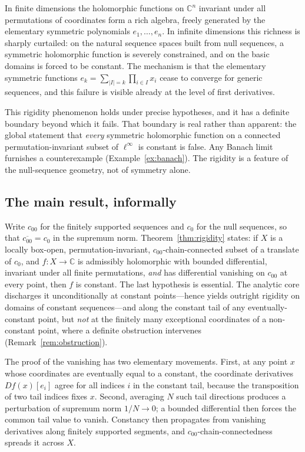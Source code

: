 \documentclass[11pt]{amsart}
\newcommand{\CC}{\mathbb{C}}
\newcommand{\cc}{c_{00}}
\newcommand{\czero}{c_{0}}
\theoremstyle{plain}
\theoremstyle{definition}
\theoremstyle{remark}
\begin{document}
In finite dimensions the holomorphic functions on $\CC^n$ invariant under
all permutations of coordinates form a rich algebra, freely generated by
the elementary symmetric polynomials $e_1,\ldots,e_n$. In infinite
dimensions this richness is sharply curtailed: on the natural sequence
spaces built from null sequences, a symmetric holomorphic function is
severely constrained, and on the basic domains is forced to be constant.
The mechanism is that the elementary symmetric functions
$e_k=\sum_{|I|=k}\prod_{i\in I}x_i$ cease to converge for generic
sequences, and this failure is visible already at the level of first
derivatives.

This rigidity phenomenon holds under precise hypotheses, and it has a
definite boundary beyond which it fails. That boundary is real rather than
apparent: the global statement that \emph{every} symmetric holomorphic
function on a connected permutation-invariant subset of $\ell^\infty$ is
constant is false. Any Banach limit furnishes a counterexample
(Example~\ref{ex:banach}). The rigidity is a feature of the null-sequence
geometry, not of symmetry alone.

\subsection*{The main result, informally}
Write $\cc$ for the finitely supported sequences and $\czero$ for the null
sequences, so that $\overline{\cc}=\czero$ in the supremum norm.
Theorem~\ref{thm:rigidity} states: if $X$ is a locally box-open,
permutation-invariant, $\cc$-chain-connected subset of a translate of
$\czero$, and $f:X\to\CC$ is admissibly holomorphic with bounded
differential, invariant under all finite permutations, \emph{and} has
differential vanishing on $\cc$ at every point, then $f$ is constant. The
last hypothesis is essential. The analytic core discharges it
unconditionally at constant points---hence yields outright rigidity on
domains of constant sequences---and along the constant tail of any
eventually-constant point, but \emph{not} at the finitely many exceptional
coordinates of a non-constant point, where a definite obstruction
intervenes (Remark~\ref{rem:obstruction}).

The proof of the vanishing has two elementary movements. First, at any
point $x$ whose coordinates are eventually equal to a constant, the
coordinate derivatives $Df(x)[e_i]$ agree for all indices $i$ in the
constant tail, because the transposition of two tail indices fixes $x$.
Second, averaging $N$ such tail directions produces a perturbation of
supremum norm $1/N\to 0$; a bounded differential then forces the common tail
value to vanish. Constancy then propagates from vanishing derivatives along
finitely supported segments, and $\cc$-chain-connectedness spreads it across
$X$.
\end{document}

